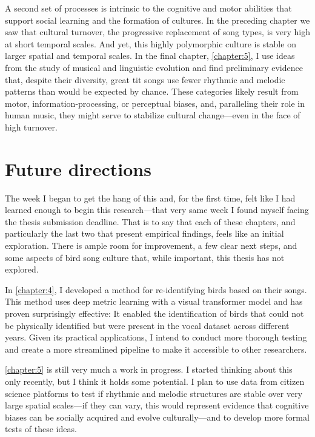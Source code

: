 A second set of processes is intrinsic to the cognitive and motor abilities that support social learning and the formation of cultures. In the preceding chapter we saw that cultural turnover, the progressive replacement of song types, is very high at short temporal scales. And yet, this highly polymorphic culture is stable on larger spatial and temporal scales. In the final chapter, \autoref{chapter:5}, I use ideas from the study of musical and linguistic evolution and find preliminary evidence that, despite their diversity, great tit songs use fewer rhythmic and melodic patterns than would be expected by chance. These categories likely result from motor, information-processing, or perceptual biases, and, paralleling their role in human music, they might serve to stabilize cultural change---even in the face of high turnover.

\section{Future directions}
The week I began to get the hang of this and, for the first time, felt like I had learned enough to begin this research---that very same week I found myself facing the thesis submission deadline. That is to say that each of these chapters, and particularly the last two that present empirical findings, feels like an initial exploration. There is ample room for improvement, a few clear next steps, and some aspects of bird song culture that, while important, this thesis has not explored.

In \autoref{chapter:4}, I developed a method for re-identifying birds based on their songs. This method uses deep metric learning with a visual transformer model and has proven surprisingly effective: It enabled the identification of birds that could not be physically identified but were present in the vocal dataset across different years. Given its practical applications, I intend to conduct more thorough testing and create a more streamlined pipeline to make it accessible to other researchers.

\autoref{chapter:5} is still very much a work in progress. I started thinking about this only recently, but I think it holds some potential. I plan to use data from citizen science platforms to test if rhythmic and melodic structures are stable over very large spatial scales---if they can vary, this would represent evidence that cognitive biases can be socially acquired and evolve culturally---and to develop more formal tests of these ideas.

